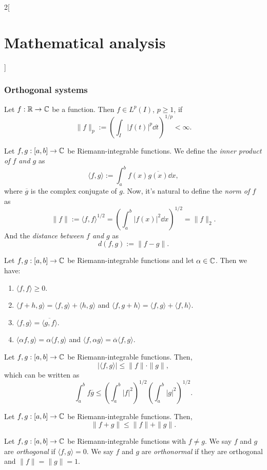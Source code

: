 \documentclass[../../../main.tex]{subfiles}
\begin{document}
\begin{multicols}{2}[\section{Mathematical analysis}]
  \subsubsection{Orthogonal systems}
  \begin{definition}
    Let $f:\mathbb{R} \rightarrow\mathbb{C} $ be a function. Then $f\in L^p(I)$, $p\geq1$, if $$\|f\|_p:=\left(\int_I|f(t)|^p\dd t\right)^{1/p}<\infty.$$
  \end{definition}
  \begin{definition}
    Let $f,g:[a,b]\rightarrow\mathbb{C} $ be Riemann-integrable functions. We define the \textit{inner product of $f$ and $g$} as $$\langle f,g\rangle:=\int_a^bf(x)\overline{g(x)}\dd x,$$ where $\overline{g}$ is the complex conjugate of $g$. Now, it's natural to define the \textit{norm of $f$} as $$\|f\|:=\langle f,f\rangle^{1/2}=\left(\int_a^b|f(x)|^2\dd x\right)^{1/2}=\|f\|_2.$$ And the \textit{distance between $f$ and $g$} as $$d(f,g):=\|f-g\|.$$
  \end{definition}
  \begin{prop}
    Let $f,g:[a,b]\rightarrow\mathbb{C} $ be Riemann-integrable functions and let $\alpha\in\mathbb{C} $. Then we have:
    \begin{enumerate}
      \item $\langle f,f\rangle\geq 0$.
      \item $\langle f+h,g\rangle=\langle f,g\rangle+\langle h,g\rangle$ and $\langle f,g+h\rangle=\langle f,g\rangle+\langle f,h\rangle$.
      \item $\langle f,g\rangle=\overline{\langle g,f\rangle}$.
      \item $\langle \alpha f,g\rangle=\alpha\langle f,g\rangle$ and $\langle f,\alpha g\rangle=\overline{\alpha}\langle f,g\rangle$.
    \end{enumerate}
  \end{prop}
  \begin{theorem}
    Let $f,g:[a,b]\rightarrow\mathbb{C} $ be Riemann-integrable functions. Then, $$|\langle f,g\rangle|\leq\|f\|\cdot\|g\|,$$ which can be written as $$\int_a^bf\overline{g}\leq\left(\int_a^b|f|^2\right)^{1/2}\left(\int_a^b|g|^2\right)^{1/2}.$$
  \end{theorem}
  \begin{theorem}
    Let $f,g:[a,b]\rightarrow\mathbb{C} $ be Riemann-integrable functions. Then, $$\| f+g\|\leq\|f\|+\|g\|.$$
  \end{theorem}
  \begin{definition}
    Let $f,g:[a,b]\rightarrow\mathbb{C} $ be Riemann-integrable functions with $f\ne g$. We say $f$ and $g$ are \textit{orthogonal} if $\langle f,g\rangle=0$. We say $f$ and $g$ are \textit{orthonormal} if they are orthogonal and $\|f\|=\|g\|=1$.

\end{definition}
\end{multicols}
\end{document}
